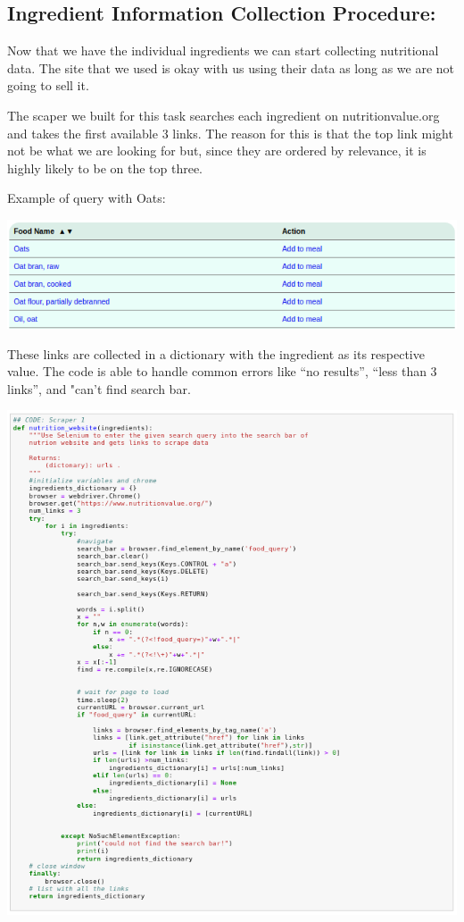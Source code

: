 \documentclass[11pt]{article}
\makeatletter
\def\maxwidth{\ifdim\Gin@nat@width>\linewidth\linewidth
    \else\Gin@nat@width\fi}
\let\Oldincludegraphics\includegraphics
\renewcommand{\includegraphics}[1]{\Oldincludegraphics[width=.8\maxwidth]{#1}}
\makeatother
\begin{document}
    \hypertarget{ingredient-information-collection-procedure}{%
\subsection{Ingredient Information Collection
Procedure:}\label{ingredient-information-collection-procedure}}

Now that we have the individual ingredients we can start collecting
nutritional data. The site that we used is okay with us using their data
as long as we are not going to sell it.

    The scaper we built for this task searches each ingredient on
nutritionvalue.org and takes the first available 3 links. The reason for
this is that the top link might not be what we are looking for but,
since they are ordered by relevance, it is highly likely to be on the
top three.

Example of query with Oats:

\includegraphics{nutrition_value_query.png}

    These links are collected in a dictionary with the ingredient as its
respective value. The code is able to handle common errors like ``no
results'', ``less than 3 links'', and "can't find search bar.

\includegraphics{isaac_code1.png}
\end{document}
